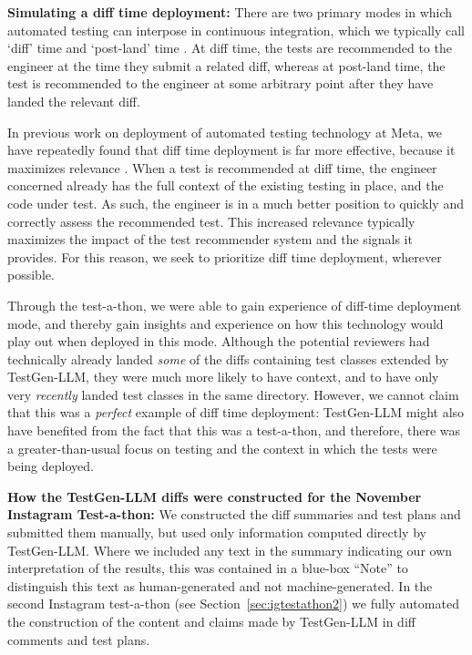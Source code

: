 \documentclass[sigconf,screen]{acmart}
\begin{document}
\noindent
{\bf
Simulating a diff time deployment:} 
There are two primary modes in which automated testing can interpose in continuous integration, which we typically call `diff' time and `post-land' time \cite{mhetal:ssbse18-keynote,jaetal:mia}.
At diff time, the tests are recommended to the engineer at the time they submit a related diff, whereas at post-land time, the test is recommended to the engineer at some arbitrary point after they have landed the relevant diff.


In previous work on deployment of automated testing technology at Meta, we have repeatedly found that diff time deployment is far more effective, because it maximizes relevance \cite{mhpoh:scam18-keynote}.
When a test is recommended at diff time, the engineer concerned already has the full context of the existing testing in place, and the code under test.
As such, the engineer is in a much better position to quickly and correctly assess the recommended test. 
This increased relevance typically maximizes the impact of the test recommender system and the signals it provides. 
For this reason, we seek to prioritize diff time deployment, wherever possible.

Through the test-a-thon, we were able to gain experience of diff-time deployment mode, and thereby gain insights and experience on how this technology would play out when deployed in this mode.
Although the potential reviewers had technically already landed {\em some} of the diffs containing test classes extended by TestGen-LLM, 
they were much more likely to have context, and to have only very {\em recently} landed test classes in the same directory. 
However, we cannot claim that this was a {\em perfect} example of diff time deployment: TestGen-LLM might also have benefited from the fact that this was a test-a-thon, and therefore, there was a greater-than-usual focus on testing and the context in which the tests were being deployed.

\noindent
{\bf
How the TestGen-LLM diffs were constructed for the November Instagram Test-a-thon:} 
We constructed the diff summaries and test plans and submitted them manually, but used only information computed directly by TestGen-LLM.  Where we included any text in the summary indicating our own interpretation of the results, this was contained in a blue-box “Note” to distinguish this text as human-generated and not machine-generated.  
In the second Instagram test-a-thon (see Section~\ref{sec:igtestathon2}) we fully automated the construction of the content and claims made by TestGen-LLM in diff comments and test plans.
\end{document}
